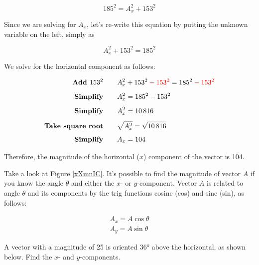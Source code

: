 \documentclass[main.tex]{subfiles}
\begin{document}
\begin{equation*}
    185^2 = A_x^2 + 153^2
\end{equation*}

Since we are solving for $A_x$, let's re-write this equation by putting the unknown variable on the left, simply as 

\begin{equation*}
    A_x^2 + 153^2 = 185^2
\end{equation*}

We solve for the horizontal component as follows:

\begin{align*}
    \textbf{Add $153^2$} \qquad & A_x^2 + 153^2 \mathbin{\color{red} -} \textcolor{red}{153^2} = 185^2 \mathbin{\color{red} -} \textcolor{red}{153^2}\\[1ex]
    \textbf{Simplify} \qquad & A_x^2 = 185^2 - 153^2\\[1ex]
    \textbf{Simplify} \qquad & A_x^2 = \num{10816}\\[1ex]
    \textbf{Take square root} \qquad & \sqrt{A_x^2} = \sqrt{\num{10816}}\\[1ex]
    \textbf{Simplify} \qquad & A_x = 104
\end{align*}

Therefore, the magnitude of the horizontal ($x$) component of the vector is 104.

\solutionEnd

Take a look at Figure \ref{xXmnIC}. It's possible to find the magnitude of vector $A$ if you know the angle $\theta$ and either the $x$- or $y$-component. Vector $A$ is related to  angle $\theta$ and its components by the trig functions cosine (cos) and sine (sin), as follows:

\begin{align}
    A_x = A \cos{\theta} \label{06CyUc}\\[1ex]
    A_y = A \sin{\theta} \label{aBWDIc}
\end{align}

\begin{example}
    A vector with a magnitude of 25 is oriented \ang{36} above the horizontal, as shown below. Find the $x$- and $y$-components.
\end{example}

\begin{center}
\end{center}
\end{document}
